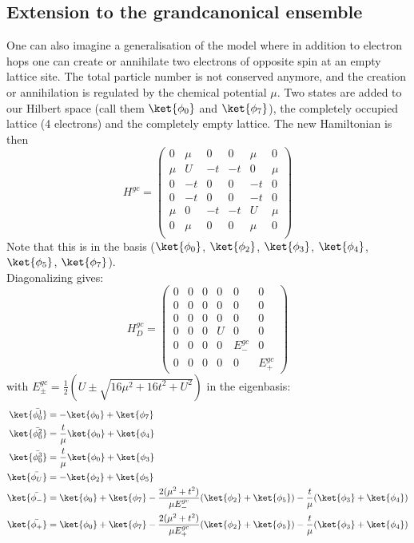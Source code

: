 \subsection*{Extension to the grandcanonical ensemble}
One can also imagine a generalisation of the model where in addition to electron hops one can create or annihilate two electrons of opposite spin at an empty lattice site. The total particle number is not conserved anymore, and the creation or annihilation is regulated by the chemical potential $\mu$. Two states are added to our Hilbert space (call them $\ket{\phi_0}$ and $\ket{\phi_7}$), the completely occupied lattice (4 electrons) and the completely empty lattice. The new Hamiltonian is then
\begin{equation*}
H^{gc}=
\begin{pmatrix}
 0 &\mu&0 &0&\mu&0\\
\mu & U & -t&-t&0&\mu\\
 0& -t & 0&0&-t&0\\
0& -t & 0&0&-t&0\\
\mu & 0 & -t&-t&U&\mu\\
 0 &\mu&0 &0&\mu&0\\
\end{pmatrix}
\end{equation*}
Note that this is in the basis ($\ket{\phi_0}$, $\ket{\phi_2}$, $\ket{\phi_3}$, $\ket{\phi_4}$, $\ket{\phi_5}$, $\ket{\phi_7}$).\\ Diagonalizing gives:
\begin{equation*}
H_D^{gc}=
\begin{pmatrix}
0 & 0&0 &0&0&0\\
0 & 0 & 0&0&0&0\\
0& 0 & 0&0&0&0\\
0& 0 & 0&U&0&0\\
0 & 0 & 0&0&E^{gc}_{-}&0\\
0 &0&0 &0&0&E^{gc}_{+}
\end{pmatrix}
\end{equation*}
with $E^{gc}_{\pm}=\frac{1}{2}(U\pm\sqrt{16\mu^2+16t^2+U^2})$
in the eigenbasis:
\begin{align*}
\ket{\bar{\phi^1_{0}}}&=-\ket{\phi_0}+\ket{\phi_7}\\
\ket{\bar{\phi^2_{0}}}&=\frac{t}{\mu}\ket{\phi_0}+\ket{\phi_4}\\
\ket{\bar{\phi^3_{0}}}&=\frac{t}{\mu}\ket{\phi_0}+\ket{\phi_3}\\
\ket{\bar{\phi_{U}}}&=-\ket{\phi_2} + \ket{\phi_5}	\\
\ket{\bar{\phi_{-}}}&=\ket{\phi_0}+\ket{\phi_7}-\frac{2(\mu^2+t^2)}{\mu E_-^{gc}}(\ket{\phi_2}+\ket{\phi_5})-\frac{t}{\mu}(\ket{\phi_3}+\ket{\phi_4})	\\
\ket{\bar{\phi_{+}}}&=	\ket{\phi_0}+\ket{\phi_7}-\frac{2(\mu^2+t^2)}{\mu E_+^{gc}}(\ket{\phi_2}+\ket{\phi_5})-\frac{t}{\mu}(\ket{\phi_3}+\ket{\phi_4})
\end{align*}
